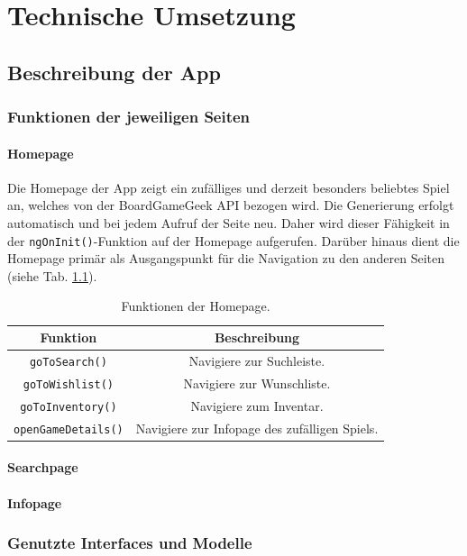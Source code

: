 \chapter{Technische Umsetzung}
\section{Beschreibung der App}
\subsection{Funktionen der jeweiligen Seiten}
\subsubsection{Homepage}
Die Homepage der App zeigt ein zufälliges und derzeit besonders beliebtes Spiel an, welches von der BoardGameGeek \ac{API} bezogen wird.
Die Generierung erfolgt automatisch und bei jedem Aufruf der Seite neu. Daher wird dieser Fähigkeit in der \texttt{ngOnInit()}-Funktion auf der Homepage aufgerufen.
Darüber hinaus dient die Homepage primär als Ausgangspunkt für die Navigation zu den anderen Seiten (siehe Tab. \ref{tab:homepage}).
\begin{table}[H]
    \centering
    \begin{tabular}{|c|c|}
        \hline
        \textbf{Funktion} & \textbf{Beschreibung} \\
        \hline
        \texttt{goToSearch()} & Navigiere zur Suchleiste. \\
        \texttt{goToWishlist()} & Navigiere zur Wunschliste. \\
        \texttt{goToInventory()} & Navigiere zum Inventar. \\
        \texttt{openGameDetails()} & Navigiere zur Infopage des zufälligen Spiels. \\
        \hline
    \end{tabular}
    \caption{Funktionen der Homepage.}
    \label{tab:homepage}
\end{table}

\subsubsection{Searchpage}
\subsubsection{Infopage}
\subsection{Genutzte Interfaces und Modelle}
